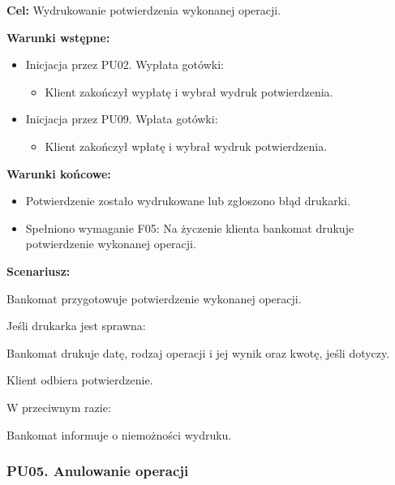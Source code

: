\documentclass[10pt,a4paper]{article}
\begin{document}
\noindent\textbf{Cel:} Wydrukowanie potwierdzenia wykonanej operacji.

\noindent\textbf{Warunki wstępne:}
\begin{itemize}
    \item Inicjacja przez PU02. Wypłata gotówki:
    \begin{itemize}
        \item Klient zakończył wypłatę i wybrał wydruk potwierdzenia.
    \end{itemize}
    \item Inicjacja przez PU09. Wpłata gotówki:
    \begin{itemize}
        \item Klient zakończył wpłatę i wybrał wydruk potwierdzenia.
    \end{itemize}
\end{itemize}

\noindent\textbf{Warunki końcowe:}
\begin{itemize}
    \item Potwierdzenie zostało wydrukowane lub zgłoszono błąd drukarki.
    \item Spełniono wymaganie F05: Na życzenie klienta bankomat drukuje potwierdzenie wykonanej operacji.
\end{itemize}

\noindent\textbf{Scenariusz:}
\begin{scenariusz}
    \item Bankomat przygotowuje potwierdzenie wykonanej operacji.
    \item Jeśli drukarka jest sprawna:
    \begin{scenariusz}
        \item Bankomat drukuje datę, rodzaj operacji i jej wynik oraz kwotę, jeśli dotyczy.
        \item Klient odbiera potwierdzenie.
    \end{scenariusz}
    \item W przeciwnym razie:
    \begin{scenariusz}
        \item Bankomat informuje o niemożności wydruku.
    \end{scenariusz}
\end{scenariusz}


\subsubsection*{PU05. Anulowanie operacji}
\end{document}
